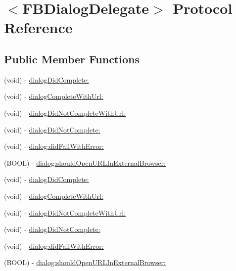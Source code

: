 \hypertarget{protocol_f_b_dialog_delegate-p}{
\section{$<$\-F\-B\-Dialog\-Delegate$>$ \-Protocol \-Reference}
\label{protocol_f_b_dialog_delegate-p}
}
\subsection*{\-Public \-Member \-Functions}
\begin{DoxyCompactItemize}
\item 
(void) -\/ \hyperlink{protocol_f_b_dialog_delegate-p_a90dbc90d847c73d4b7c46851dad27088}{dialog\-Did\-Complete\-:}
\item 
(void) -\/ \hyperlink{protocol_f_b_dialog_delegate-p_a59efe809bb196af4b1888651c396e786}{dialog\-Complete\-With\-Url\-:}
\item 
(void) -\/ \hyperlink{protocol_f_b_dialog_delegate-p_a87a756757aef6af9bc35dafcab6cd259}{dialog\-Did\-Not\-Complete\-With\-Url\-:}
\item 
(void) -\/ \hyperlink{protocol_f_b_dialog_delegate-p_a1a9d02c6b2ea3cd0cd836daaa4a8c436}{dialog\-Did\-Not\-Complete\-:}
\item 
(void) -\/ \hyperlink{protocol_f_b_dialog_delegate-p_a72d2d07e22a7ecc75565bcfcbe4948ad}{dialog\-:did\-Fail\-With\-Error\-:}
\item 
(\-B\-O\-O\-L) -\/ \hyperlink{protocol_f_b_dialog_delegate-p_a78ae11dc38f12fb05c0d9658c76825d1}{dialog\-:should\-Open\-U\-R\-L\-In\-External\-Browser\-:}
\item 
(void) -\/ \hyperlink{protocol_f_b_dialog_delegate-p_a90dbc90d847c73d4b7c46851dad27088}{dialog\-Did\-Complete\-:}
\item 
(void) -\/ \hyperlink{protocol_f_b_dialog_delegate-p_a59efe809bb196af4b1888651c396e786}{dialog\-Complete\-With\-Url\-:}
\item 
(void) -\/ \hyperlink{protocol_f_b_dialog_delegate-p_a87a756757aef6af9bc35dafcab6cd259}{dialog\-Did\-Not\-Complete\-With\-Url\-:}
\item 
(void) -\/ \hyperlink{protocol_f_b_dialog_delegate-p_a1a9d02c6b2ea3cd0cd836daaa4a8c436}{dialog\-Did\-Not\-Complete\-:}
\item 
(void) -\/ \hyperlink{protocol_f_b_dialog_delegate-p_a72d2d07e22a7ecc75565bcfcbe4948ad}{dialog\-:did\-Fail\-With\-Error\-:}
\item 
(\-B\-O\-O\-L) -\/ \hyperlink{protocol_f_b_dialog_delegate-p_a78ae11dc38f12fb05c0d9658c76825d1}{dialog\-:should\-Open\-U\-R\-L\-In\-External\-Browser\-:}

\end{DoxyCompactItemize}
